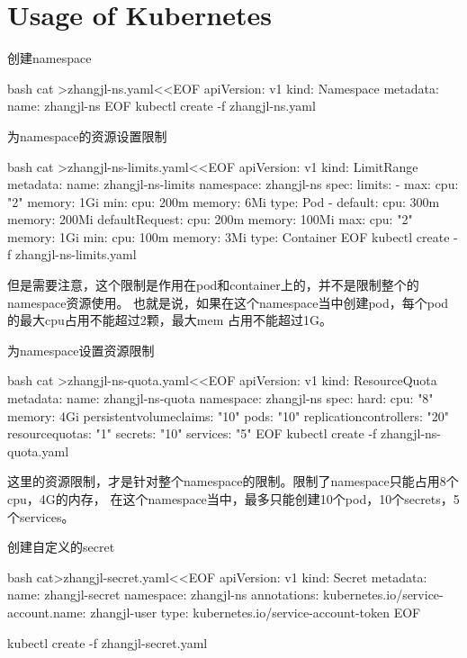 \section{Usage of Kubernetes}
\begin{outline}[enumerate]
\1 创建namespace
\begin{code-block}{bash}
cat >zhangjl-ns.yaml<<EOF
apiVersion: v1
kind: Namespace
metadata:
  name: zhangjl-ns
EOF
kubectl create -f zhangjl-ns.yaml
\end{code-block}

\1 为namespace的资源设置限制
\begin{code-block}{bash}
cat >zhangjl-ns-limits.yaml<<EOF
apiVersion: v1
kind: LimitRange
metadata:
  name: zhangjl-ns-limits
  namespace: zhangjl-ns
spec:
  limits:
  - max:
      cpu: "2"
      memory: 1Gi
    min:
      cpu: 200m
      memory: 6Mi
    type: Pod
  - default:
      cpu: 300m
      memory: 200Mi
    defaultRequest:
      cpu: 200m
      memory: 100Mi
    max:
      cpu: "2"
      memory: 1Gi
    min:
      cpu: 100m
      memory: 3Mi
    type: Container
EOF
kubectl create -f zhangjl-ns-limits.yaml
\end{code-block}
但是需要注意，这个限制是作用在pod和container上的，并不是限制整个的namespace资源使用。
也就是说，如果在这个namespace当中创建pod，每个pod的最大cpu占用不能超过2颗，最大mem
占用不能超过1G。

\1 为namespace设置资源限制
\begin{code-block}{bash}
cat >zhangjl-ns-quota.yaml<<EOF
apiVersion: v1
kind: ResourceQuota
metadata:
  name: zhangjl-ns-quota
  namespace: zhangjl-ns
spec:
  hard:
    cpu: "8"
    memory: 4Gi
    persistentvolumeclaims: "10"
    pods: "10"
    replicationcontrollers: "20"
    resourcequotas: "1"
    secrets: "10"
    services: "5"
EOF
kubectl create -f zhangjl-ns-quota.yaml
\end{code-block}
这里的资源限制，才是针对整个namespace的限制。限制了namespace只能占用8个cpu，4G的内存，
在这个namespace当中，最多只能创建10个pod，10个secrets，5个services。

\1 创建自定义的secret
\begin{code-block}{bash}
cat>zhangjl-secret.yaml<<EOF
apiVersion: v1
kind: Secret
metadata:
  name: zhangjl-secret
  namespace: zhangjl-ns
  annotations:
    kubernetes.io/service-account.name: zhangjl-user
type: kubernetes.io/service-account-token
EOF

kubectl create -f zhangjl-secret.yaml
\end{code-block}


\end{outline}
